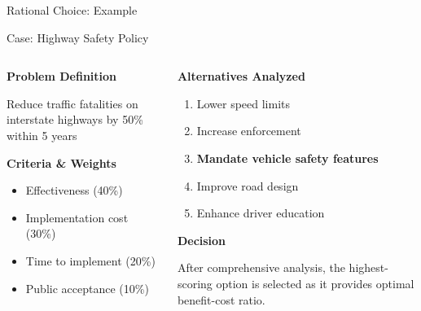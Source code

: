 \documentclass[10pt]{beamer}
\begin{document}
\begin{frame}{Rational Choice: Example}
\begin{block}{Case: Highway Safety Policy}
\end{block}

\begin{columns}
\begin{column}{0.5\textwidth}
\textbf{Problem Definition}

Reduce traffic fatalities on interstate highways by 50\% within 5 years

\vspace{0.5cm}
\textbf{Criteria \& Weights}
\begin{itemize}
\item Effectiveness (40\%)
\item Implementation cost (30\%)
\item Time to implement (20\%)
\item Public acceptance (10\%)
\end{itemize}
\end{column}
\begin{column}{0.5\textwidth}
\textbf{Alternatives Analyzed}
\begin{enumerate}
\item Lower speed limits
\item Increase enforcement
\item \textcolor{titanorange}{\textbf{Mandate vehicle safety features}}
\item Improve road design
\item Enhance driver education
\end{enumerate}

\vspace{0.5cm}
\textbf{Decision}

After comprehensive analysis, the highest-scoring option is selected as it provides optimal benefit-cost ratio.
\end{column}
\end{columns}
\end{frame}
\end{document}

